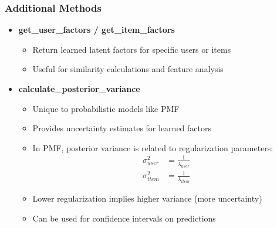 \documentclass{beamer}
\begin{document}
\begin{frame}
\frametitle{Additional Methods}

\begin{itemize}
    \item \textbf{get\_user\_factors / get\_item\_factors}
    \begin{itemize}
        \item Return learned latent factors for specific users or items
        \item Useful for similarity calculations and feature analysis
    \end{itemize}
    
    \vspace{0.5cm}
    
    \item \textbf{calculate\_posterior\_variance}
    \begin{itemize}
        \item Unique to probabilistic models like PMF
        \item Provides uncertainty estimates for learned factors
        \item In PMF, posterior variance is related to regularization parameters:
        \begin{align*}
        \sigma^2_{user} &= \frac{1}{\lambda_{user}} \\
        \sigma^2_{item} &= \frac{1}{\lambda_{item}}
        \end{align*}
        \item Lower regularization implies higher variance (more uncertainty)
        \item Can be used for confidence intervals on predictions
    \end{itemize}
\end{itemize}
\end{frame}
\end{document}
